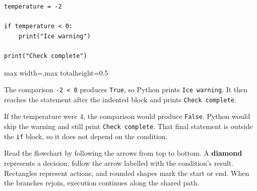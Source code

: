 \documentclass[12pt,a4paper]{article}
\begin{document}
\begin{minipage}{\linewidth}
\begin{lstlisting}
temperature = -2

if temperature < 0:
    print("Ice warning")

print("Check complete")
\end{lstlisting}
\end{minipage}
\par
\begin{center}
\begin{adjustbox}{max width=\linewidth,max totalheight=0.5\textheight}
\end{adjustbox}
\end{center}
The comparison \texttt{-2 < 0} produces \texttt{True}, so Python prints \texttt{Ice warning}. It then reaches the statement after the indented block and prints \texttt{Check complete}.

If the temperature were 4, the comparison would produce \texttt{False}. Python would skip the warning and still print \texttt{Check complete}. That final statement is outside the \texttt{if} block, so it does not depend on the condition.

Read the flowchart by following the arrows from top to bottom. A \textbf{diamond} represents a decision; follow the arrow labelled with the condition's result. Rectangles represent actions, and rounded shapes mark the start or end. When the branches rejoin, execution continues along the shared path.
\end{document}
